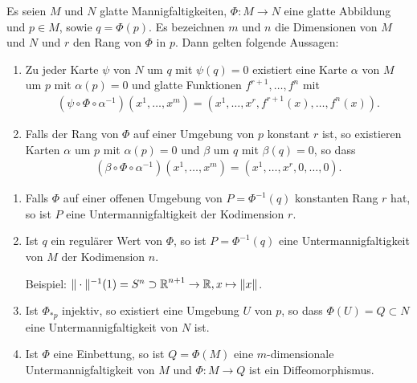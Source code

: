 \begin{Satz}\label{satz-3-4}
  Es seien $M$ und $N$ glatte Mannigfaltigkeiten, $\Phi \colon M \to N$ eine glatte Abbildung und $p \in M$, sowie $q = \Phi(p)$. Es bezeichnen $m$ und $n$ die Dimensionen von $M$ und $N$ und $r$ den Rang von $\Phi$ in $p$. Dann gelten folgende Aussagen:
  \begin{enumerate}[label=(\roman*),leftmargin=*,widest=ii]
  \item Zu jeder Karte $\psi$ von $N$ um $q$ mit $\psi(q) = 0$ existiert eine Karte $\alpha$ von $M$ um $p$ mit $\alpha(p) = 0$ und glatte Funktionen $f^{r+1},\ldots,f^n$ mit
    \begin{align*}
      \left(\psi \circ \Phi \circ \alpha^{-1}\right)\left(x^1,\ldots, x^m\right) = \left(x^1, \ldots, x^{r}, f^{r+1}(x), \ldots, f^n(x)\right).
    \end{align*}
  \item Falls der Rang von $\Phi$ auf einer Umgebung von $p$ konstant $r$ ist, so existieren Karten $\alpha$ um $p$ mit $\alpha(p) = 0$ und $\beta$ um $q$ mit $\beta(q) = 0$, so dass
    \begin{align*}
      \left(\beta \circ \Phi \circ \alpha^{-1}\right)\left(x^1, \ldots, x^m\right) = \left(x^1, \ldots, x^r, 0, \ldots, 0\right).
    \end{align*}
  \end{enumerate}
\end{Satz} 

\begin{Kor}
  \begin{enumerate}[label=(\roman*),widest=iii,leftmargin=*]
  \item Falls $\Phi$ auf einer offenen Umgebung von $P = \Phi^{-1}(q)$ konstanten Rang $r$ hat, so ist $P$ eine Untermannigfaltigkeit der Kodimension $r$.
  \item Ist $q$ ein regulärer Wert von $\Phi$, so ist $P = \Phi^{-1}(q)$ eine Untermannigfaltigkeit von $M$ der Kodimension $n$.
  
    Beispiel: $\|\cdot\|^{-1}(1) = S^n \supset \operatorname{\mathbb{R}}^{n+1} \to \operatorname{\mathbb{R}}, x \mapsto \|x\|$.
  \item Ist $\Phi_{*p}$ injektiv, so existiert eine Umgebung $U$ von $p$, so dass $\Phi(U) = Q \subset N$ eine Untermannigfaltigkeit von $N$ ist.
  \item Ist $\Phi$ eine Einbettung, so ist $Q = \Phi(M)$ eine $m$-dimensionale Untermannigfaltigkeit von $M$ und $\Phi \colon M \to Q$ ist ein Diffeomorphismus.
  \end{enumerate}
\end{Kor}

